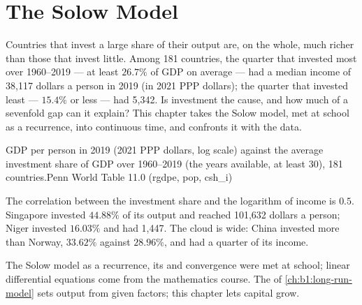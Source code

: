 \chapter{The Solow Model}\label{ch:b1:solow-model}

Countries that invest a large share of their output are, on the whole,
much richer than those that invest little. Among 181 countries, the quarter
that invested most over 1960--2019 --- at least $26.7\%$ of GDP on average --- had a
median income of 38,117 dollars a person in 2019 (in 2021 PPP dollars); the quarter that invested
least --- $15.4\%$ or less --- had 5,342. %
Is investment the cause, and how much of a sevenfold gap can it explain?
This chapter takes the Solow model, met at school as a recurrence, into
continuous time, and confronts it with the data.

\begin{openingchart}{GDP per person in 2019 (2021 PPP dollars, log scale)
against the average investment share of GDP over 1960--2019 (the years
available, at least 30), 181 countries.}{Penn World
Table 11.0 (rgdpe, pop, csh\_i)}
\end{openingchart}

The correlation between the investment share and the logarithm of income
is $0.5$. %
Singapore invested $44.88\%$ of its output and reached 101,632 dollars a
person; Niger invested $16.03\%$ and had 1,447. %
The cloud is wide: China invested more than Norway, $33.62\%$ against
$28.96\%$, and had a quarter of its income. %

\begin{recall}
The Solow model as a recurrence, its  and convergence were met
at school; linear differential equations come from the mathematics
course. The  of \cref{ch:b1:long-run-model} sets output
from given factors; this chapter lets capital grow.
\end{recall}

